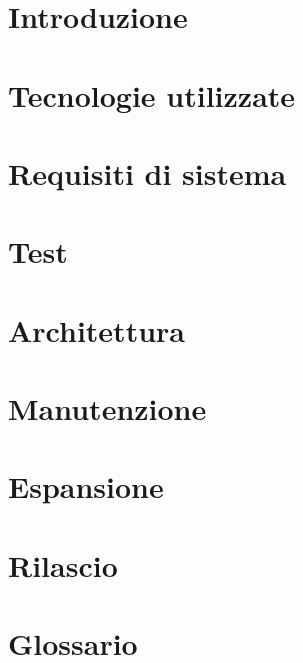 \documentclass[]{article}
\begin{document}
	
	\newpage
	\tableofcontents
	\newpage
	\listoffigures
	\listoftables
	\newpage


	\section{Introduzione}
	
	\newpage

	\section{Tecnologie utilizzate}
	
	\newpage

	\section{Requisiti di sistema}
	
	\newpage

	\section{Test}
	
	\newpage

	\section{Architettura}
	
	\newpage

	\section{Manutenzione}
	
	\newpage
	
	\section{Espansione}
	
	\newpage
	
	\section{Rilascio}
	
	\newpage
	
	\appendix
	\section{Glossario}
	
	\newpage
	
\end{document}
